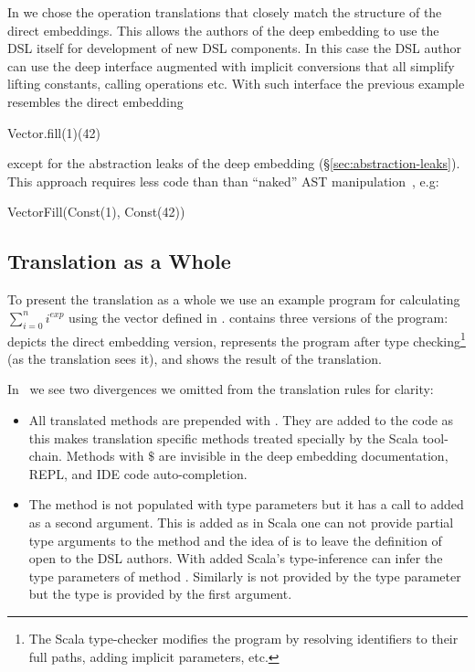 In \yy we chose the operation translations that closely match the structure of
 the direct embeddings. This allows the authors of the deep embedding to use the
 DSL itself for development of new DSL components. In this case the DSL author can use
 the deep interface augmented with implicit conversions that all simplify lifting constants,
 calling operations etc. With such interface the previous example resembles the direct embedding\begin{lstparagraph}
Vector.fill(1)(42)
\end{lstparagraph}
except for the abstraction leaks of the deep embedding (\S \ref{sec:abstraction-leaks}).
This approach requires less code than than ``naked'' AST manipulation~\cite{visser2004program}, e.g:\begin{lstparagraph}
VectorFill(Const(1), Const(42))
\end{lstparagraph}


\subsection{Translation as a Whole}
\label{sec:translation-example}

To present the translation as a whole we use an example program for calculating $\sum_{i=0}^n i^{exp}$ using the vector \edsl defined in .  contains three versions of the program:  depicts the direct embedding version,  represents the program after type checking\footnote{The Scala type-checker modifies the program by resolving identifiers to their full paths, adding implicit parameters, etc.} (as the translation sees it), and  shows the result of the translation.

In~ we see two divergences we omitted from the translation rules for clarity:\begin{itemize}

\item All translated methods are prepended with \code{$\$$}. They are added to the code as this makes translation specific methods treated specially by the Scala tool-chain. Methods with $\$$ are invisible in the deep embedding documentation, REPL, and IDE code auto-completion.

\item The method  is not populated with type parameters but it has a call to  added as a second argument. This is added as in Scala one can not provide partial
type arguments to the method and the idea of \yy is to leave the definition of  open to the DSL authors. With  added Scala's type-inference can infer the type parameters of method . Similarly  is not provided by the type
parameter but the type is provided by the first argument.

\end{itemize}


